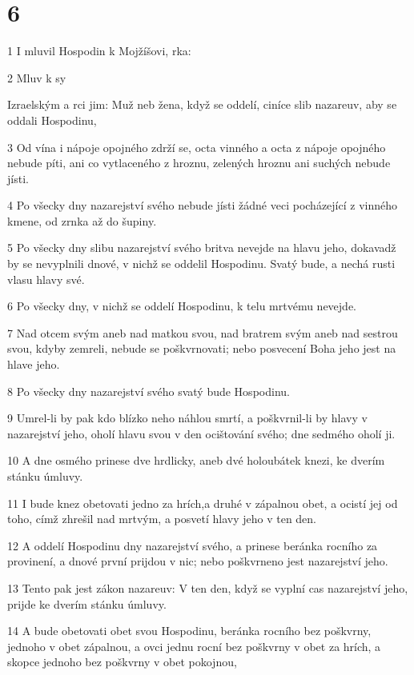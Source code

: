 \chapter{6}

\par 1 I mluvil Hospodin k Mojžíšovi, rka:
\par 2 Mluv k sy\par Izraelským a rci jim: Muž neb žena, když se oddelí, ciníce slib nazareuv, aby se oddali Hospodinu,
\par 3 Od vína i nápoje opojného zdrží se, octa vinného a octa z nápoje opojného nebude píti, ani co vytlaceného z hroznu, zelených hroznu ani suchých nebude jísti.
\par 4 Po všecky dny nazarejství svého nebude jísti žádné veci pocházející z vinného kmene, od zrnka až do šupiny.
\par 5 Po všecky dny slibu nazarejství svého britva nevejde na hlavu jeho, dokavadž by se nevyplnili dnové, v nichž se oddelil Hospodinu. Svatý bude, a nechá rusti vlasu hlavy své.
\par 6 Po všecky dny, v nichž se oddelí Hospodinu, k telu mrtvému nevejde.
\par 7 Nad otcem svým aneb nad matkou svou, nad bratrem svým aneb nad sestrou svou, kdyby zemreli, nebude se poškvrnovati; nebo posvecení Boha jeho jest na hlave jeho.
\par 8 Po všecky dny nazarejství svého svatý bude Hospodinu.
\par 9 Umrel-li by pak kdo blízko neho náhlou smrtí, a poškvrnil-li by hlavy v nazarejství jeho, oholí hlavu svou v den ocištování svého; dne sedmého oholí ji.
\par 10 A dne osmého prinese dve hrdlicky, aneb dvé holoubátek knezi, ke dverím stánku úmluvy.
\par 11 I bude knez obetovati jedno za hrích,a druhé v zápalnou obet, a ocistí jej od toho, címž zhrešil nad mrtvým, a posvetí hlavy jeho v ten den.
\par 12 A oddelí Hospodinu dny nazarejství svého, a prinese beránka rocního za provinení, a dnové první prijdou v nic; nebo poškvrneno jest nazarejství jeho.
\par 13 Tento pak jest zákon nazareuv: V ten den, když se vyplní cas nazarejství jeho, prijde ke dverím stánku úmluvy.
\par 14 A bude obetovati obet svou Hospodinu, beránka rocního bez poškvrny, jednoho v obet zápalnou, a ovci jednu rocní bez poškvrny v obet za hrích, a skopce jednoho bez poškvrny v obet pokojnou,
